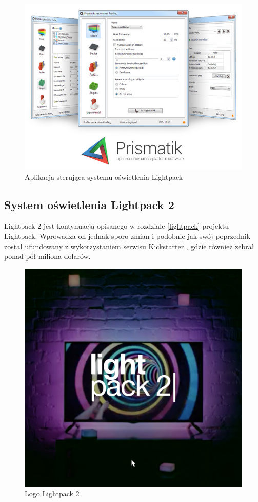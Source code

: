 \documentclass[12pt]{report}
\begin{document}
\begin{figure}[h]
\centering
\includegraphics[width=.7\textwidth]{../resources/prismatik.jpg}
\caption[Aplikacja sterująca systemu oświetlenia Lightpack]{Aplikacja sterująca systemu oświetlenia Lightpack \cite{lps}}
\end{figure}

\vfill
\clearpage

\subsection{System oświetlenia Lightpack 2}

Lightpack 2 jest kontynuacją opisanego w rozdziale \ref{lightpack} projektu Lightpack. Wprowadza on jednak sporo zmian i podobnie jak swój poprzednik został ufundowany z wykorzystaniem serwisu Kickstarter \cite{lp2k}, gdzie również zebrał ponad pół miliona dolarów.

\begin{figure}[h]
\centering
\includegraphics[width=.5\textwidth]{../resources/lightpack2.jpg}
\caption[Logo Lightpack 2]{Logo Lightpack 2 \cite{lp2s}}
\end{figure}
\end{document}
